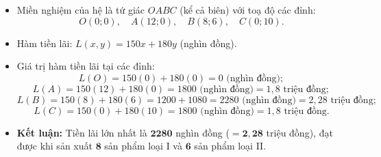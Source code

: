 \documentclass[12pt,a4paper]{article}
\begin{document}
\vspace{0.2cm}
\begin{itemize}[leftmargin=1.5em, itemsep=3pt]
    \item Miền nghiệm của hệ là tứ giác $OABC$ (kể cả biên) với toạ độ các đỉnh:
    \[
    O(0;0), \quad A(12;0), \quad B(8;6), \quad C(0;10).
    \]
    \item Hàm tiền lãi: $L(x, y) = 150x + 180y$ (nghìn đồng).
    \item Giá trị hàm tiền lãi tại các đỉnh:
    \[
    L(O) = 150(0) + 180(0) = 0 \text{ (nghìn đồng)};
    \]
    \[
    L(A) = 150(12) + 180(0) = 1800 \text{ (nghìn đồng)} = 1{,}8 \text{ triệu đồng};
    \]
    \[
    L(B) = 150(8) + 180(6) = 1200 + 1080 = 2280 \text{ (nghìn đồng)} = 2{,}28 \text{ triệu đồng};
    \]
    \[
    L(C) = 150(0) + 180(10) = 1800 \text{ (nghìn đồng)} = 1{,}8 \text{ triệu đồng}.
    \]
    \item \textbf{Kết luận:} Tiền lãi lớn nhất là $\mathbf{2280}$ nghìn đồng ($=\mathbf{2{,}28}$ triệu đồng), đạt được khi sản xuất $\mathbf{8}$ sản phẩm loại I và $\mathbf{6}$ sản phẩm loại II.
\end{itemize}
\end{document}
